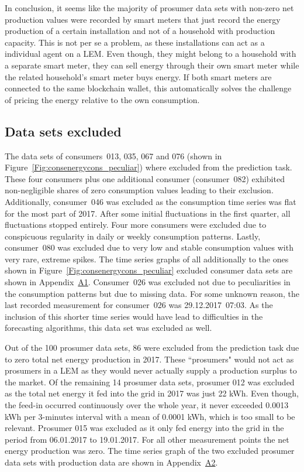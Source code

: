 In conclusion, it seems like the majority of prosumer data sets with non-zero net production values were recorded by smart meters that just record the energy production of a certain installation and not of a household with production capacity. This is not per se a problem, as these installations can act as a individual agent on a LEM. Even though, they might belong to a household with a separate smart meter, they can sell energy through their own smart meter while the related household's smart meter buys energy. If both smart meters are connected to the same blockchain wallet, this automatically solves the challenge of pricing the energy relative to the own consumption.




\newpage
\subsection{Data sets excluded}\label{Sec:Data;Subsec:Exclusion}
The data sets of consumers~013, 035, 067 and 076 (shown in Figure~\ref{Fig:consenergycons_peculiar}) where excluded from the prediction task. These four consumers plus one additional consumer (consumer~082) exhibited non-negligible shares of zero consumption values leading to their exclusion. Additionally, consumer~046 was excluded as the consumption time series was flat for the most part of 2017. After some initial fluctuations in the first quarter, all fluctuations stopped entirely. Four more consumers were excluded due to conspicuous regularity in daily or weekly consumption patterns. Lastly, consumer~080 was excluded due to very low and stable consumption values with very rare, extreme spikes. The time series graphs of all additionally to the ones shown in Figure~\ref{Fig:consenergycons_peculiar} excluded consumer data sets are shown in Appendix~\hyperlink{AppA1:Figures:Excludedc}{A1}. Consumer~026 was excluded not due to peculiarities in the consumption patterns but due to missing data. For some unknown reason, the last recorded measurement for consumer~026 was 29.12.2017~07:03. As the inclusion of this shorter time series would have lead to difficulties in the forecasting algorithms, this data set was excluded as well.

Out of the 100 prosumer data sets, 86 were excluded from the prediction task due to zero total net energy production in 2017. These ``prosumers" would not act as prosumers in a LEM as they would never actually supply a production surplus to the market. Of the remaining 14 prosumer data sets, prosumer 012 was excluded as the total net energy it fed into the grid in 2017 was just 22 kWh. Even though, the feed-in occurred continuously over the whole year, it never exceeded 0.0013 kWh per 3-minutes interval with a mean of 0.0001 kWh, which is too small to be relevant. Prosumer 015 was excluded as it only fed energy into the grid in the period from 06.01.2017 to 19.01.2017. For all other measurement points the net energy production was zero. The time series graph of the two excluded prosumer data sets with production data are shown in Appendix~\hyperlink{AppA2:Figures:Excludedp}{A2}.

